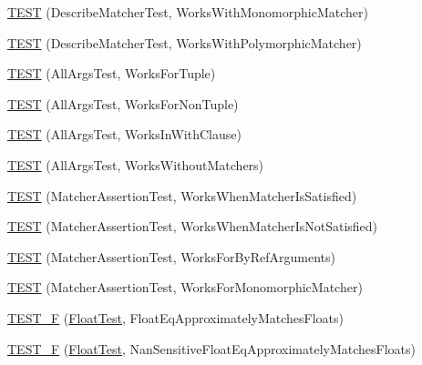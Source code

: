 \begin{DoxyCompactItemize}
\item 
\mbox{\hyperlink{namespacetesting_1_1gmock__matchers__test_a3874504a484739f047b6e3c295b5764a}{T\+E\+ST}} (Describe\+Matcher\+Test, Works\+With\+Monomorphic\+Matcher)
\item 
\mbox{\hyperlink{namespacetesting_1_1gmock__matchers__test_a6232037654e87ad5ddd4a21abd73a5a4}{T\+E\+ST}} (Describe\+Matcher\+Test, Works\+With\+Polymorphic\+Matcher)
\item 
\mbox{\hyperlink{namespacetesting_1_1gmock__matchers__test_aeea300647af4c7611f4e491cabcbf950}{T\+E\+ST}} (All\+Args\+Test, Works\+For\+Tuple)
\item 
\mbox{\hyperlink{namespacetesting_1_1gmock__matchers__test_aacc3ed6d6a0f9ff552019d0d58817b6f}{T\+E\+ST}} (All\+Args\+Test, Works\+For\+Non\+Tuple)
\item 
\mbox{\hyperlink{namespacetesting_1_1gmock__matchers__test_ad62534535946b2ef45457fb653f73a98}{T\+E\+ST}} (All\+Args\+Test, Works\+In\+With\+Clause)
\item 
\mbox{\hyperlink{namespacetesting_1_1gmock__matchers__test_ab923c90d7512191ce1cb37055e76e9b9}{T\+E\+ST}} (All\+Args\+Test, Works\+Without\+Matchers)
\item 
\mbox{\hyperlink{namespacetesting_1_1gmock__matchers__test_ad37559f9112c04334a62ce9617cf1349}{T\+E\+ST}} (Matcher\+Assertion\+Test, Works\+When\+Matcher\+Is\+Satisfied)
\item 
\mbox{\hyperlink{namespacetesting_1_1gmock__matchers__test_a2f3755be7052d6e7769e3323053399d0}{T\+E\+ST}} (Matcher\+Assertion\+Test, Works\+When\+Matcher\+Is\+Not\+Satisfied)
\item 
\mbox{\hyperlink{namespacetesting_1_1gmock__matchers__test_afcf1287c7fd759157367026613ddd727}{T\+E\+ST}} (Matcher\+Assertion\+Test, Works\+For\+By\+Ref\+Arguments)
\item 
\mbox{\hyperlink{namespacetesting_1_1gmock__matchers__test_a0fe4bde05f667c4877e3b4a4a7bde002}{T\+E\+ST}} (Matcher\+Assertion\+Test, Works\+For\+Monomorphic\+Matcher)
\item 
\mbox{\hyperlink{namespacetesting_1_1gmock__matchers__test_a69257e935b4334c835b3ad26acea9104}{T\+E\+S\+T\+\_\+F}} (\mbox{\hyperlink{namespacetesting_1_1gmock__matchers__test_a145329e433869625f9f0e98a0cdfd7b4}{Float\+Test}}, Float\+Eq\+Approximately\+Matches\+Floats)
\item 
\mbox{\hyperlink{namespacetesting_1_1gmock__matchers__test_abb691880cd22f6f444c978547b13f792}{T\+E\+S\+T\+\_\+F}} (\mbox{\hyperlink{namespacetesting_1_1gmock__matchers__test_a145329e433869625f9f0e98a0cdfd7b4}{Float\+Test}}, Nan\+Sensitive\+Float\+Eq\+Approximately\+Matches\+Floats)

\end{DoxyCompactItemize}
